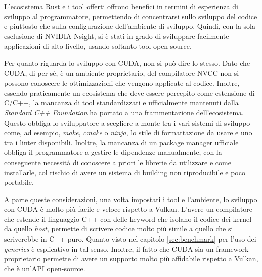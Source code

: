 L'ecosistema Rust e i tool offerti offrono benefici in termini di esperienza di sviluppo al programmatore, permettendo di concentrarsi sullo sviluppo del codice e piuttosto che sulla configurazione dell'ambiente di sviluppo. Quindi, con la sola esclusione di NVIDIA Nsight, si è stati in grado di sviluppare facilmente applicazioni di alto livello, usando soltanto tool open-source.

\newpage

Per quanto riguarda lo sviluppo con \gls{CUDA}, non si può dire lo stesso. Dato che \gls{CUDA}, di per sè, è un ambiente proprietario, del compilatore \gls{NVCC} non si possono conoscere le ottimizzazioni che vengono applicate al codice. Inoltre, essendo praticamente un ecosistema che deve essere percepito come estensione di C/C++, la mancanza di tool standardizzati e ufficialmente mantenuti dalla \textit{Standard C++ Foundation} ha portato a una frammentazione dell'ecosistema. Questo obbliga lo sviluppatore a scegliere a monte tra i vari sistemi di sviluppo come, ad esempio, \textit{make}, \textit{cmake} o \textit{ninja}, lo stile di formattazione da usare e uno tra i linter disponibili. Inoltre, la mancanza di un package manager ufficiale obbliga il programmatore a gestire le dipendenze manualmente, con la conseguente necessità di conoscere a priori le librerie da utilizzare e come installarle, col rischio di avere un sistema di building non riproducibile e poco portabile.

A parte queste considerazioni, una volta impostati i tool e l'ambiente, lo sviluppo con \gls{CUDA} è molto più facile e veloce rispetto a Vulkan. L'avere un
compilatore che estende il linguaggio C++ con delle keyword che isolano il
codice dei kernel da quello \textit{host}, permette di scrivere codice molto più simile a quello che si scriverebbe in C++ puro. Quanto visto nel capitolo \ref{sec:benchmark} per l'uso dei \textit{generics} è esplicativo in tal senso. Inoltre, il fatto che \gls{CUDA} sia un framework proprietario permette di avere un supporto molto più affidabile rispetto a Vulkan, che è un'\gls{API} open-source.


